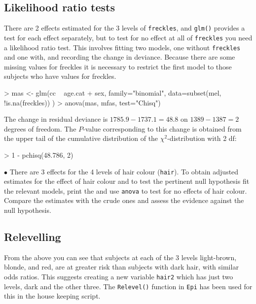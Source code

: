 \subsection{Likelihood ratio tests}

There are 2 effects estimated for the 3 levels of {\tt freckles}, and {\tt glm()} provides a test for each effect separately, but to test for no effect at all of {\tt freckles} you need a likelihood ratio test. This involves fitting two models, one without {\tt freckles} and one with, and recording the change in deviance. Because there are some missing values for freckles it is necessary to restrict the first model to those subjects who have values for freckles.
\begin{Schunk}
\begin{Sinput}
> mas <- glm(cc ~ age.cat + sex, family="binomial", data=subset(mel, !is.na(freckles)) )
> anova(mas, mfas, test="Chisq")
\end{Sinput}
\end{Schunk}
The change in residual deviance is $1785.9-1737.1=48.8$ on $1389-1387=2$ degrees of freedom.
The $P$-value corresponding to this change is obtained from the upper tail of the
cumulative distribution of the $\chi^2$-distribution with 2 df:
\begin{Schunk}
\begin{Sinput}
> 1 - pchisq(48.786, 2)
\end{Sinput}
\end{Schunk}

\medskip
$\bullet$
There are 3 effects for the 4 levels of hair colour ({\tt hair}). 
To obtain adjusted estimates for the effect of hair colour and to test the pertinent null hypothesis fit the relevant models, print the and use {\tt anova} to test for no effects of hair colour.
Compare the estimates with the crude ones and assess the evidence against the null hypothesis. 

\subsection{Relevelling}

From the above you can see that subjects at each of the 3 levels light-brown, blonde, and red, are at greater risk than subjects with dark hair, with similar odds ratios. This suggests creating a new variable {\tt hair2} which has just two levels, dark and the other three. The {\tt Relevel()} function in \texttt{Epi} has been used for this in the house keeping script.

